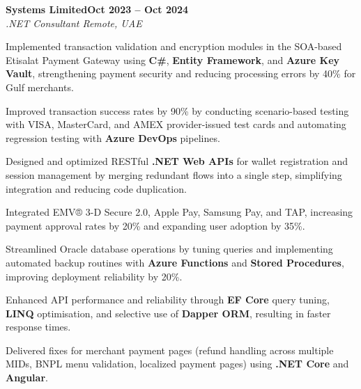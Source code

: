 \documentclass[letterpaper,10pt]{article}
\newcommand{\headingBf}[2]{
  \hspace{10pt}\textbf{#1}\hfill\textbf{#2}\\
}
\newcommand{\headingIt}[2]{
  \hspace{10pt}\textit{#1}\hfill\textit{#2}\\
}
\newenvironment{resume_list}{
  \vspace{-7pt}
  \begin{itemize}[itemsep=-2px, parsep=1pt, leftmargin=30pt]
}{
  \end{itemize}
}
\begin{document}
\headingBf{Systems Limited}{Oct 2023 -- Oct 2024}
\headingIt{.NET Consultant \hfill Remote, UAE}{}
\begin{resume_list}
    \item Implemented transaction validation and encryption modules in the SOA-based Etisalat Payment Gateway using \textbf{C\#}, \textbf{Entity Framework}, and \textbf{Azure Key Vault}, strengthening payment security and reducing processing errors by 40\% for Gulf merchants.
    \item Improved transaction success rates by 90\% by conducting scenario-based testing with VISA, MasterCard, and AMEX provider-issued test cards and automating regression testing with \textbf{Azure DevOps} pipelines.
    \item Designed and optimized RESTful \textbf{.NET Web APIs} for wallet registration and session management by merging redundant flows into a single step, simplifying integration and reducing code duplication.
    \item Integrated EMV® 3-D Secure 2.0, Apple Pay, Samsung Pay, and TAP, increasing payment approval rates by 20\% and expanding user adoption by 35\%.
    \item Streamlined Oracle database operations by tuning queries and implementing automated backup routines with \textbf{Azure Functions} and \textbf{Stored Procedures}, improving deployment reliability by 20\%.
    \item Enhanced API performance and reliability through \textbf{EF Core} query tuning, \textbf{LINQ} optimisation, and selective use of \textbf{Dapper ORM}, resulting in faster response times.
    \item Delivered fixes for merchant payment pages (refund handling across multiple MIDs, BNPL menu validation, localized payment pages) using \textbf{.NET Core} and \textbf{Angular}.
\end{resume_list}
\end{document}
